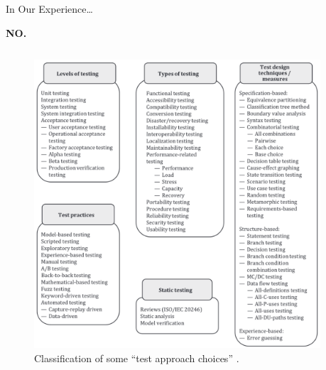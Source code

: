 \documentclass[22pt]{beamer}
\begin{document}
\begin{frame}[fragile]
\begin{textblock}{7.25}
        \begin{block}{\fontsize{37}{20}\selectfont In Our Experience\dots}
            \vspace{5mm}
            \begin{center}
                {\fontsize{185}{20}\selectfont \textbf{NO.}}
            \end{center}
            \vspace{4mm}
            \begin{columns}
                \begin{column}{0.7\textwidth}
                    \begin{center}
                        \begin{figure}
                            \centering
                            \includegraphics[width=\textwidth]{test approach choices.png}
                            \vspace{-7mm}
                            \caption{Classification of some ``test approach choices''
                                \cite[p.~22]{IEEE2022}.}
                            \label{Fig:approach-choices}
                        \end{figure}
                    \end{center}
                \end{column}
                \begin{column}{0.25\textwidth}

\end{column}
\end{columns}
\end{block}
\end{textblock}
\end{frame}
\end{document}
